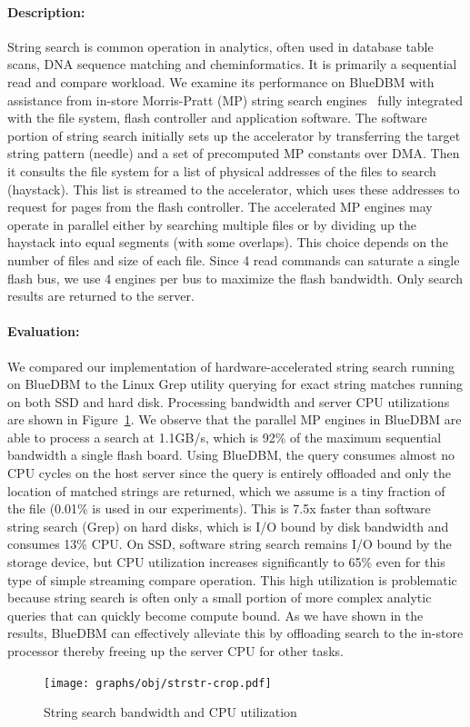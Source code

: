 \paragraph{Description:}
String search is common operation in analytics, often used in
database table scans, DNA sequence matching and cheminformatics. It is 
primarily a sequential read and compare workload. We
examine its performance on BlueDBM with assistance from in-store Morris-Pratt (MP) 
string search engines~\cite{mpalgo} fully integrated with the file system, flash controller
and application software.  The software portion of string search initially sets
up the accelerator by transferring the target string pattern (needle) and a set
of precomputed MP constants over DMA. Then it consults the file system for a
list of physical addresses of the files to search (haystack).  This list is
streamed to the accelerator, which uses these addresses to request for pages
from the flash controller.  The accelerated MP engines may operate in parallel
either by searching multiple files or by dividing up the haystack into equal
segments (with some overlaps). This choice depends on the number of files and
size of each file. Since 4 read commands can saturate a single flash bus, we
use 4 engines per bus to maximize the flash bandwidth. Only
search results are returned to the server. 

\paragraph{Evaluation:}
We compared our implementation of hardware-accelerated string search running on
BlueDBM to the Linux Grep utility querying for exact string matches running
on both SSD and hard disk. Processing bandwidth and server CPU utilizations are
shown in Figure~\ref{fig:result_strstr}. We observe that the parallel MP
engines in BlueDBM are able to process a search at 1.1GB/s, which is 92\% of
the maximum sequential bandwidth a single flash board. Using BlueDBM, the
query consumes almost no CPU cycles on the host server since the query is
entirely offloaded and only the location of matched strings are returned, which
we assume is a tiny fraction of the file (0.01\% is used in our experiments).
This is 7.5x faster than software string search (Grep) on hard disks, which is
I/O bound by disk bandwidth and consumes 13\% CPU. On SSD, software string
search remains I/O bound by the storage device, but CPU utilization increases
significantly to 65\% even for this type of simple streaming compare operation.
This high utilization is problematic because string search is often only a small portion 
of more complex analytic queries that can quickly become compute bound.  As we
have shown in the results, BlueDBM can effectively alleviate this by
offloading search to the in-store processor thereby freeing up the server CPU
for other tasks. 
 


\begin{figure}[t]
	\centering
	\texttt{[image: graphs/obj/strstr-crop.pdf]}
	\caption{String search bandwidth and CPU utilization}
	\label{fig:result_strstr}
\end{figure}

